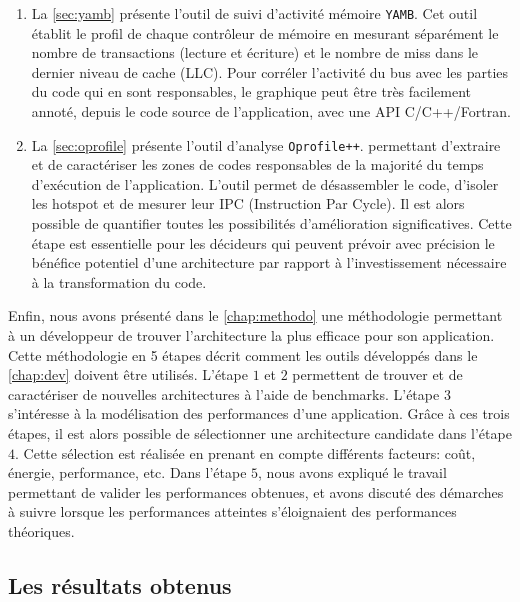 \begin{enumerate}
            \item La \autoref{sec:yamb} présente l'outil de suivi d'activité mémoire \verb|YAMB|. Cet outil établit le profil de chaque contrôleur de mémoire en mesurant séparément le nombre de transactions (lecture et écriture) et le nombre de \gls{miss} dans le dernier niveau de cache (LLC). Pour corréler l'activité du bus avec les parties du code qui en sont responsables, le graphique peut être très facilement annoté, depuis le code source de l'application, avec une API C/C++/Fortran.
            
            \item La \autoref{sec:oprofile} présente  l'outil d'analyse \verb|Oprofile++|.
            permettant d'extraire et de caractériser les zones de codes responsables de la majorité du temps d'exécution de l'application. L'outil permet de désassembler le code, d'isoler les \gls{hotspot} et de mesurer leur IPC (Instruction Par Cycle). Il est alors possible de quantifier toutes les possibilités d'amélioration significatives. Cette étape est essentielle pour les décideurs qui peuvent prévoir avec précision le bénéfice potentiel d'une architecture par rapport à l'investissement nécessaire à la transformation du code.
        
        \end{enumerate}
        
        Enfin, nous avons présenté dans le \autoref{chap:methodo} une méthodologie permettant à un développeur de trouver l'architecture la plus efficace pour son application. Cette méthodologie en 5 étapes décrit comment les outils développés dans le \autoref{chap:dev} doivent être utilisés. L'étape $1$ et $2$ permettent de trouver et de caractériser de nouvelles architectures à l'aide de \glspl{benchmark}. L'étape $3$ s'intéresse à la modélisation des performances d'une application. Grâce à ces trois étapes, il est alors possible de sélectionner une architecture candidate dans l'étape $4$. Cette sélection est réalisée en prenant en compte différents facteurs: coût, énergie, performance, etc. Dans l'étape $5$, nous avons expliqué le travail permettant de valider les performances obtenues, et avons discuté des démarches à suivre lorsque les performances atteintes s'éloignaient des performances théoriques.
               
 
 
    \subsection{Les résultats obtenus}
   
